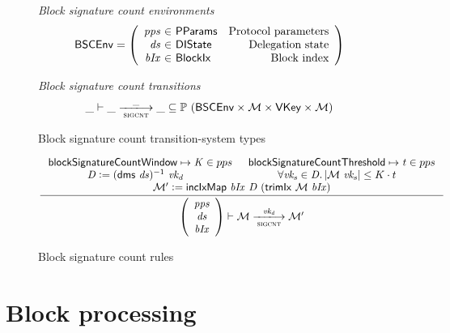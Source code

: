 \documentclass[11pt,a4paper]{article}
\newcommand{\powerset}[1]{\mathbb{P}~#1}
\newcommand{\var}[1]{\mathit{#1}}
\newcommand{\fun}[1]{\mathsf{#1}}
\newcommand{\type}[1]{\mathsf{#1}}
\newcommand{\pp}[1]{\mathsf{#1}}
\newcommand{\size}[1]{\left| #1 \right|}
\newcommand{\trans}[2]{\xlongrightarrow[\textsc{#1}]{#2}}
\newcommand{\leteq}{\ensuremath{\mathrel{\mathop:}=}}
\newcommand{\partialf}{\mapsto}
\newcommand{\BlockIx}{\type{BlockIx}}
\newcommand{\VKey}{\type{VKey}}
\newcommand{\DelegState}{\type{DIState}}
\newcommand{\ProtParams}{\type{PParams}} %
\newcommand{\signmapname}{\mathcal{M}}
\newcommand{\trimixname}{trimIx}
\newcommand{\incixmapname}{incIxMap}
\newcommand{\signmap}[1]{\fun{\signmapname} ~ #1}
\newcommand{\trimix}[2]{\fun{\trimixname} ~ #1 ~ #2}
\newcommand{\incixmap}[3]{\fun{\incixmapname} ~ #1 ~ #2 ~ #3}
\begin{document}
\begin{figure}[ht]
  \emph{Block signature count environments}
  \begin{equation*}
    \BSCEnv =
    \left(
      \begin{array}{r@{~\in~}lr}
        \var{pps} & \ProtParams & \text{Protocol parameters} \\
        \var{ds} & \DelegState & \text{Delegation state} \\
        \var{bIx} & \BlockIx & \text{Block index}
      \end{array}
    \right)
  \end{equation*}

  \emph{Block signature count transitions}
  \begin{equation*}
    \_ \vdash \var{\_} \trans{sigcnt}{\_} \var{\_} \subseteq
    \powerset (\BSCEnv \times \signmapname \times \VKey \times \signmapname)
  \end{equation*}
  \caption{Block signature count transition-system types}
  \label{fig:ts-types:sigcnt}
\end{figure}

\begin{figure}[ht]
  \begin{equation*}
    \inference
    {
      \pp{blockSignatureCountWindow} \partialf \var{K} \in pps & \pp{blockSignatureCountThreshold} \partialf \var{t} \in pps \\
      \var{D} \leteq (\fun{dms} ~ \var{ds})^{-1} ~ \var{vk_d} & \forall \var{vk_s} \in \var{D} . \size{\signmap{\var{vk_s}}} \leq K \cdot t \\
      \signmapname' \leteq \incixmap{\var{bIx}}{\var{D}}{(\trimix{\signmapname}{\var{bIx}})}
    }
    {
      \left(
        {\begin{array}{c}
           \var{pps} \\
           \var{ds} \\
           \var{bIx}
         \end{array}}
     \right)
     \vdash
     {\signmapname}
     \trans{sigcnt}{\var{vk_d}}
     {\signmapname'}
   }
   \label{eq:rule:sigcnt}
 \end{equation*}
 \caption{Block signature count rules}
 \label{fig:rules:sigcnt}
\end{figure}

\clearpage

\section{Block processing}
\label{sec:block-processing}
\end{document}
